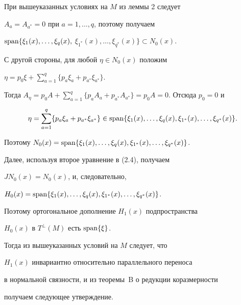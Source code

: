 При вышеуказанных условиях на $M$ из леммы 2 следует


$A_a=A_{a^*}=0$ при $a=1,\dotsc,q$, поэтому получаем


$\Span\{\xi_1(x), \dotsc, \xi_q(x),$  $\xi_{1^*}(x), \dotsc,


\xi_{q^*}(x)\} \subset N_0(x)$.


С другой стороны, для любой $\eta\in N_0(x)$ положим


$\eta=p_0\xi+\sum\limits_{a=1}^q\{p_a \xi_a+p_{a^*}\xi_{a^*}\}$.


Тогда $A_{\eta}=p_0A + \sum\limits_{a=1}^{q} \{p_a A_a+p_{a^*}A_{a^*}\}


=p_0A=0$. Отсюда $p_0=0$ и


$$


\eta=\sum_{a=1}^{q}\{p_a\xi_a+p_{a^*}\xi_{a^*}\}\in


\Span \{\xi_1(x),\dotsc,\xi_{q}(x),


\xi_{1^*}(x),\dotsc,\xi_{q^*}(x)\}.


$$


Поэтому $N_0(x)=\Span


\{\xi_1(x),\dotsc,\xi_{q}(x),\xi_{1^*}(x),\dotsc,\xi_{q^*}(x)\}$.





Далее, используя второе уравнение в (2.4), получаем


$JN_0(x)=N_0(x)$, и, следовательно,


$H_0(x)=\Span\{\xi_1(x),\dotsc,\xi_{q}(x),\xi_{1^*}(x),


\dotsc,\xi_{q^*}(x)\}$.


Поэтому ортогональное дополнение $H_1(x)$ подпространства


$H_0(x)$ в $T^\perp(M)$ есть $\operatorname{span}\{\xi\}$.


Тогда из вышеуказанных условий на $M$ следует, что


$H_1(x)$ инвариантно относительно параллельного переноса


в нормальной связности, и из теоремы~B о редукции коразмерности


получаем следующее утверждение.









